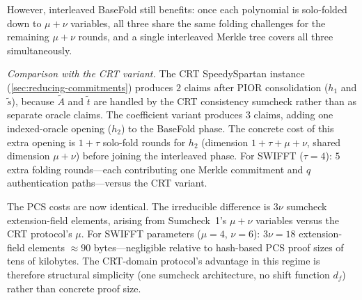 However, interleaved BaseFold still benefits: once each polynomial
is solo-folded down to $\mu + \nu$ variables, all three share the
same folding challenges for the remaining $\mu + \nu$ rounds,
and a single interleaved Merkle tree covers all three simultaneously.

\emph{Comparison with the CRT variant.}
The CRT SpeedySpartan instance (\cref{sec:reducing-commitments})
produces $2$ claims after PIOR consolidation ($h_1$ and $\tilde{s}$),
because $\tilde{A}$ and $\tilde{t}$ are handled by the CRT
consistency sumcheck rather than as separate oracle claims.
The coefficient variant produces $3$ claims, adding one
indexed-oracle opening ($h_2$) to the BaseFold phase.
The concrete cost of this extra opening is $1 + \tau$ solo-fold
rounds for $h_2$ (dimension $1 + \tau + \mu + \nu$, shared
dimension $\mu + \nu$) before joining the interleaved phase.
For SWIFFT ($\tau = 4$): $5$ extra folding rounds---each
contributing one Merkle commitment and $q$ authentication
paths---versus the CRT variant.

The PCS costs are now identical.  The irreducible difference is
$3\nu$ sumcheck extension-field elements, arising from Sumcheck~1's
$\mu + \nu$ variables versus the CRT protocol's $\mu$.
For SWIFFT parameters ($\mu = 4$, $\nu = 6$):
$3\nu = 18$ extension-field elements $\approx 90$ bytes---negligible
relative to hash-based PCS proof sizes of tens of kilobytes.
The CRT-domain protocol's advantage in this regime is therefore
structural simplicity (one sumcheck architecture, no shift function
$d_f$) rather than concrete proof size.